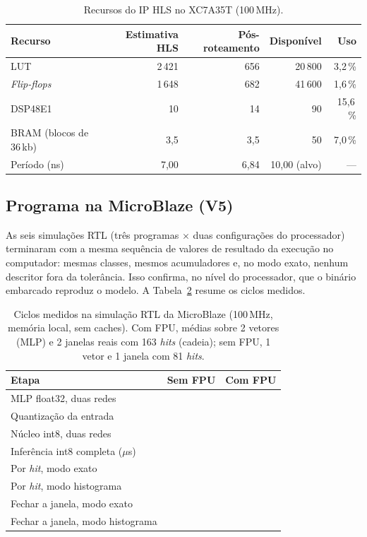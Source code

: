 \documentclass[12pt]{article}
\begin{document}
\begin{table}[htbp]
	\centering
	\small
	\caption{Recursos do IP HLS no XC7A35T (100\,MHz).}
	\label{tab:recursos}
	\begin{tabular}{lrrrr}
		\toprule
		\textbf{Recurso} & \textbf{Estimativa HLS} & \textbf{Pós-roteamento} & \textbf{Disponível} & \textbf{Uso} \\
		\midrule
		LUT & 2\,421 & 656 & 20\,800 & 3,2\,\% \\
		\textit{Flip-flops} & 1\,648 & 682 & 41\,600 & 1,6\,\% \\
		DSP48E1 & 10 & 14 & 90 & 15,6\,\% \\
		BRAM (blocos de 36\,kb) & 3,5 & 3,5 & 50 & 7,0\,\% \\
		Período (ns) & 7,00 & 6,84 & 10,00 (alvo) & --- \\
		\bottomrule
	\end{tabular}
\end{table}

\subsection{Programa na MicroBlaze (V5)}

As seis simulações RTL (três programas \(\times\) duas configurações do processador) terminaram com a mesma sequência de valores de resultado da execução no computador: mesmas classes, mesmos acumuladores e, no modo exato, nenhum descritor fora da tolerância. Isso confirma, no nível do processador, que o binário embarcado reproduz o modelo. A Tabela~\ref{tab:ciclos} resume os ciclos medidos.

\begin{table}[htbp]
	\centering
	\small
	\caption{Ciclos medidos na simulação RTL da MicroBlaze (100\,MHz, memória local, sem caches). Com FPU, médias sobre 2 vetores (MLP) e 2 janelas reais com 163 \textit{hits} (cadeia); sem FPU, 1 vetor e 1 janela com 81 \textit{hits}.}
	\label{tab:ciclos}
	\begin{tabular}{lrr}
		\toprule
		\textbf{Etapa} & \textbf{Sem FPU} & \textbf{Com FPU} \\
		\midrule
		MLP float32, duas redes & \mbMlpFloatSoft & \mbMlpFloatFpu \\
		Quantização da entrada & \mbQuantSoft & \mbQuantFpu \\
		Núcleo int8, duas redes & \mbMlpIntSoft & \mbMlpIntFpu \\
		Inferência int8 completa (\(\mu\)s) & \mbMlpIntSoftUs & \mbMlpIntFpuUs \\
		\midrule
		Por \textit{hit}, modo exato & \mbHitSoft & \mbHitFpu \\
		Por \textit{hit}, modo histograma & \mbHitHistSoft & \mbHitHistFpu \\
		Fechar a janela, modo exato & \mbFecharSoft & \mbFecharFpu \\
		Fechar a janela, modo histograma & \mbFecharHistSoft & \mbFecharHistFpu \\
		\bottomrule
	\end{tabular}
\end{table}
\end{document}
